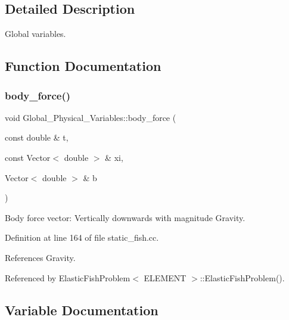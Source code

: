 \subsection{Detailed Description}
Global variables. 

\subsection{Function Documentation}
\mbox{\label{namespaceGlobal__Physical__Variables_a313e702a9e8fdec808702c9bbf38b192}} 
\subsubsection{\texorpdfstring{body\+\_\+force()}{body\_force()}}
{\footnotesize\ttfamily void Global\+\_\+\+Physical\+\_\+\+Variables\+::body\+\_\+force (\begin{DoxyParamCaption}\item[{const double \&}]{t,  }\item[{const Vector$<$ double $>$ \&}]{xi,  }\item[{Vector$<$ double $>$ \&}]{b }\end{DoxyParamCaption})}



Body force vector\+: Vertically downwards with magnitude Gravity. 



Definition at line 164 of file static\+\_\+fish.\+cc.



References Gravity.



Referenced by Elastic\+Fish\+Problem$<$ E\+L\+E\+M\+E\+N\+T $>$\+::\+Elastic\+Fish\+Problem().



\subsection{Variable Documentation}
\mbox{\label{namespaceGlobal__Physical__Variables_a849754fa7155c1a31481674ce4845658}} 
